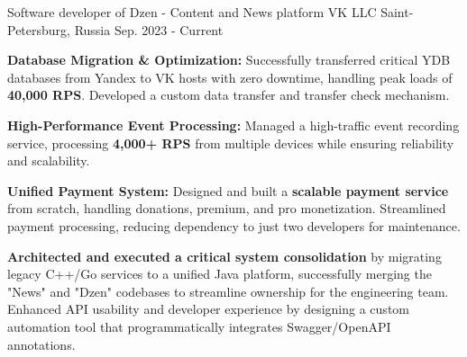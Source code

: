 

\begin{cventries}

  \cventry
    {Software developer of Dzen - Content and News platform} %
    {VK LLC} %
    {Saint-Petersburg, Russia} %
    {Sep. 2023 - Current} %
    {
      \begin{cvitems} %
        \item {\textbf{Database Migration \& Optimization:} Successfully transferred critical YDB databases from Yandex to VK hosts with zero downtime, handling peak loads of \textbf{40,000 RPS}. Developed a custom data transfer and transfer check mechanism.}
        \item {\textbf{High-Performance Event Processing:} Managed a high-traffic event recording service, processing \textbf{4,000+ RPS} from multiple devices while ensuring reliability and scalability.}
        \item {\textbf{Unified Payment System:} Designed and built a \textbf{scalable payment service} from scratch, handling donations, premium, and pro monetization. Streamlined payment processing, reducing dependency to just two developers for maintenance.}
        \item {\textbf{Architected and executed a critical system consolidation} by migrating legacy C++/Go services to a unified Java platform, successfully merging the "News" and "Dzen" codebases to streamline ownership for the engineering team. Enhanced API usability and developer experience by designing a custom automation tool that programmatically integrates Swagger/OpenAPI annotations.}
      \end{cvitems}
    }


\end{cventries}
